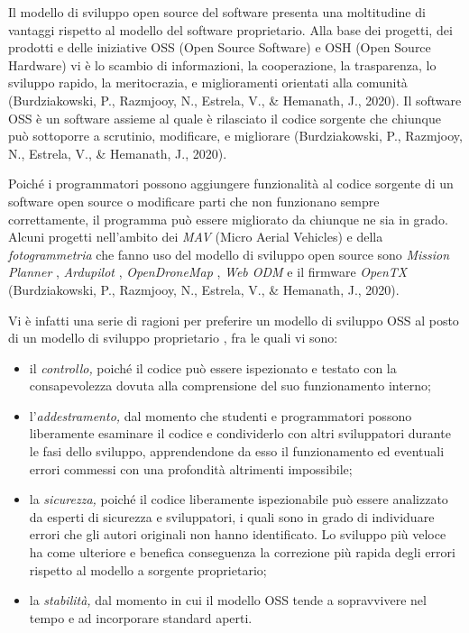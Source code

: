 \documentclass[a4paper, 12pt]{report} %
\begin{document}
Il modello di sviluppo open source del software presenta una moltitudine di vantaggi rispetto al modello del software proprietario. Alla base dei progetti, dei prodotti e delle iniziative OSS (Open Source Software) e OSH (Open Source Hardware) vi è lo scambio di informazioni, la cooperazione, la trasparenza, lo sviluppo rapido, la meritocrazia, e miglioramenti orientati alla comunità~\cite{oss-osh-uavs} (Burdziakowski, P., Razmjooy, N., Estrela, V., \& Hemanath, J., 2020). Il software OSS è un software assieme al quale è rilasciato il codice sorgente che chiunque può sottoporre a scrutinio, modificare, e migliorare (Burdziakowski, P., Razmjooy, N., Estrela, V., \& Hemanath, J., 2020).

Poiché i programmatori possono aggiungere funzionalità al codice sorgente di un software open source o modificare parti che non funzionano sempre correttamente, il programma può essere migliorato da chiunque ne sia in grado. Alcuni progetti nell'ambito dei \emph{MAV} (Micro Aerial Vehicles) e della \emph{fotogrammetria} che fanno uso del modello di sviluppo open source sono \emph{Mission Planner} \cite{mission-planner-website}, \emph{Ardupilot} \cite{ardupilot-website}, \emph{OpenDroneMap} \cite{opendronemap}, \emph{Web ODM} \cite{webodm-website} e il firmware \emph{OpenTX} (Burdziakowski, P., Razmjooy, N., Estrela, V., \& Hemanath, J., 2020).

Vi è infatti una serie di ragioni per preferire un modello di sviluppo OSS al posto di un modello di sviluppo proprietario \cite{oss-osh-uavs}, fra le quali vi sono:
\begin{itemize}
        \item il \emph{controllo,} poiché il codice può essere ispezionato e testato con la consapevolezza dovuta alla comprensione del suo funzionamento interno;
        \item l'\emph{addestramento,} dal momento che studenti e programmatori possono liberamente esaminare il codice e condividerlo con altri sviluppatori durante le fasi dello sviluppo, apprendendone da esso il funzionamento ed eventuali errori commessi con una profondità altrimenti impossibile;
        \item la \emph{sicurezza,} poiché il codice liberamente ispezionabile può essere analizzato da esperti di sicurezza e sviluppatori, i quali sono in grado di individuare errori che gli autori originali non hanno identificato. Lo sviluppo più veloce ha come ulteriore e benefica conseguenza la correzione più rapida degli errori rispetto al modello a sorgente proprietario;
        \item la \emph{stabilità,} dal momento in cui il modello OSS tende a sopravvivere nel tempo e ad incorporare standard aperti.
\end{itemize}
\end{document}
